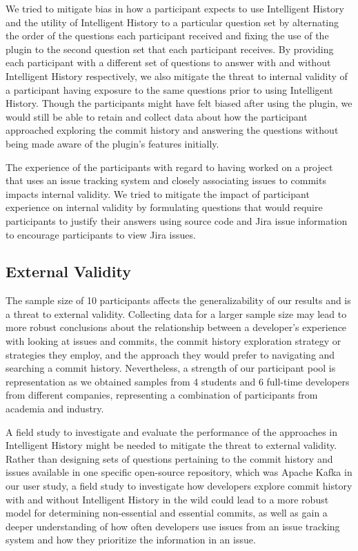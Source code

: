 We tried to mitigate bias in how a participant expects to use Intelligent History and the utility of Intelligent History to a particular question set 
by alternating the order of the questions each participant received and fixing the use of the plugin to the second question set that each participant receives.
By providing each participant with a different set of questions to answer with and without Intelligent History respectively,
we also mitigate the threat to internal validity of a participant having exposure to the same questions prior to using Intelligent History.
Though the participants might have felt biased after using the plugin,
we would still be able to retain and collect data about how the participant approached exploring the commit history and answering the questions without being made aware of the plugin's features initially.

The experience of the participants with regard to having worked on a project that uses an issue tracking system and closely associating issues to commits impacts internal validity.
We tried to mitigate the impact of participant experience on internal validity by formulating questions that would require participants to justify their answers using source code and Jira issue information to
encourage participants to view Jira issues.

\subsection{External Validity}

The sample size of 10 participants affects the generalizability of our results and is a threat to external validity.
Collecting data for a larger sample size may lead to more robust conclusions about the relationship between a developer's experience with looking at issues and commits,
the commit history exploration strategy or strategies they employ, and the approach they would prefer to navigating and searching a commit history.
Nevertheless, a strength of our participant pool is representation as we obtained samples from 4 students and 6 full-time developers from different companies,
representing a combination of participants from academia and industry.

A field study to investigate and evaluate the performance of the approaches in Intelligent History might be needed to mitigate the threat to external validity.
Rather than designing sets of questions pertaining to the commit history and issues available in one specific open-source repository,
which was Apache Kafka in our user study,
a field study to investigate how developers explore commit history with and without Intelligent History in the wild could lead to a more robust model for determining non-essential and essential commits,
as well as gain a deeper understanding of how often developers use issues from an issue tracking system and how they prioritize the information in an issue.

\endinput

Any text after an \endinput is ignored.
You could put scraps here or things in progress.